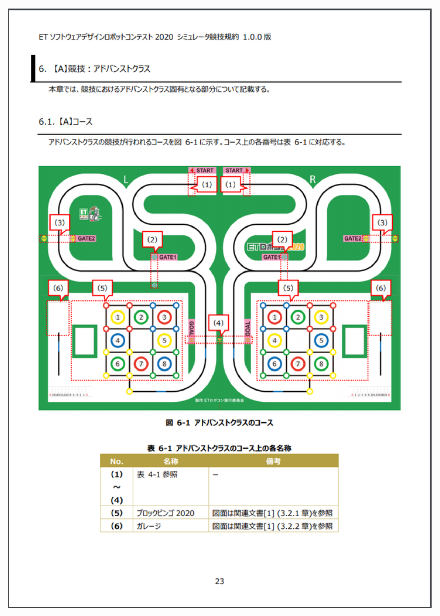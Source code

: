 \documentclass[uplatex, report, a4j, 10pt]{jsbook}
\begin{document}
\begin{figure}[tp]
    \begin{center}
    \includegraphics[width=\hsize]{specification/ET_10.eps}
    \end{center}
\end{figure}
\end{document}
